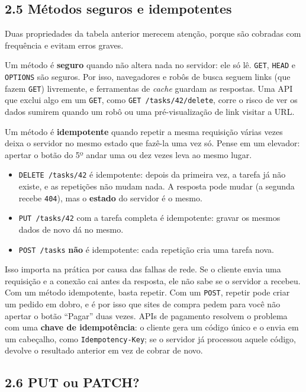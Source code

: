 \subsection{2.5 Métodos seguros e idempotentes}

Duas propriedades da tabela anterior merecem atenção, porque são cobradas com frequência e evitam erros graves.

Um método é \textbf{seguro} quando não altera nada no servidor: ele só lê. \texttt{GET}, \texttt{HEAD} e \texttt{OPTIONS} são seguros. Por isso, navegadores e robôs de busca seguem links (que fazem \texttt{GET}) livremente, e ferramentas de \textit{cache} guardam as respostas. Uma API que exclui algo em um \texttt{GET}, como \texttt{GET /tasks/42/delete}, corre o risco de ver os dados sumirem quando um robô ou uma pré-visualização de link visitar a URL.

Um método é \textbf{idempotente} quando repetir a mesma requisição várias vezes deixa o servidor no mesmo estado que fazê-la uma vez só. Pense em um elevador: apertar o botão do 5º andar uma ou dez vezes leva ao mesmo lugar.

\begin{itemize}
  \item \texttt{DELETE /tasks/42} é idempotente: depois da primeira vez, a tarefa já não existe, e as repetições não mudam nada. A resposta pode mudar (a segunda recebe \texttt{404}), mas o \textbf{estado} do servidor é o mesmo.
  \item \texttt{PUT /tasks/42} com a tarefa completa é idempotente: gravar os mesmos dados de novo dá no mesmo.
  \item \texttt{POST /tasks} \textbf{não} é idempotente: cada repetição cria uma tarefa nova.
\end{itemize}

Isso importa na prática por causa das falhas de rede. Se o cliente envia uma requisição e a conexão cai antes da resposta, ele não sabe se o servidor a recebeu. Com um método idempotente, basta repetir. Com um \texttt{POST}, repetir pode criar um pedido em dobro, e é por isso que sites de compra pedem para você não apertar o botão ``Pagar'' duas vezes. APIs de pagamento resolvem o problema com uma \textbf{chave de idempotência}: o cliente gera um código único e o envia em um cabeçalho, como \texttt{Idempotency-Key}; se o servidor já processou aquele código, devolve o resultado anterior em vez de cobrar de novo.

\subsection{2.6 PUT ou PATCH?}

